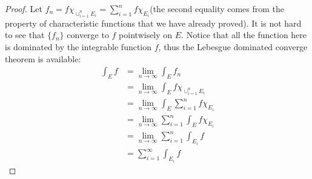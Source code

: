 \documentclass[lang=en, 12pt]{elegantbook}
\begin{document}
        \begin{proof}
            Let $f_n = f \chi_{\cup_{i=1}^{n}E_i} = \sum_{i=1}^{n} f \chi_{E_i}$(the second equality comes from the property of 
        characteristic functions that we have already proved). It is not hard to see that $\{f_n\}$ converge to $f$ pointwisely on $E$.
        Notice that all the function here is dominated by the integrable function $f$, thus the Lebesgue dominated converge theorem is 
        available:
            \begin{equation*}
                \begin{aligned}
                    \int_E f &= \lim_{n \to \infty} \int_E f_n \\
                    &= \lim_{n \to \infty} \int_E f \chi_{\cup_{i=1}^{n}E_i}\\
                    &= \lim_{n \to \infty} \int_E \sum_{i=1}^{n} f \chi_{E_i}\\
                    &= \lim_{n \to \infty} \sum_{i=1}^{n} \int_E f \chi_{E_i}\\
                    &= \lim_{n \to \infty} \sum_{i=1}^{n} \int_{E_i} f\\
                    &= \sum_{i=1}^{\infty} \int_{E_i} f
                \end{aligned}
            \end{equation*}
        \end{proof}
    
\end{document}
